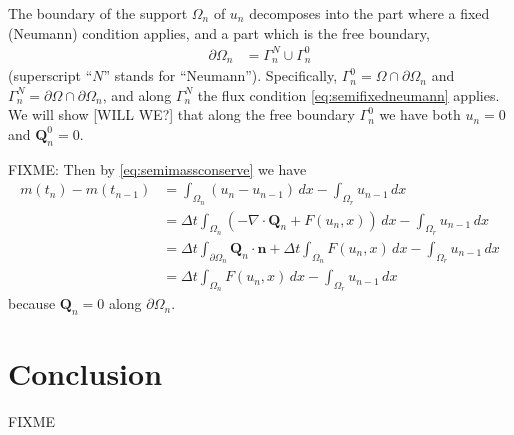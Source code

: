 \documentclass[final,leqno,onefignum,onetabnum]{siamltex1213bueler}
\newcommand\bn{\mathbf{n}}
\newcommand\bQ{\mathbf{Q}}
\newcommand{\Div}{\nabla\cdot}
\begin{document}
The boundary of the support $\Omega_n$ of $u_n$ decomposes into the part where a fixed (Neumann) condition applies, and a part which is the free boundary,
\begin{align*}
\partial\Omega_n &= \Gamma_n^N \cup \Gamma_n^0
\end{align*}
(superscript ``$N$'' stands for ``Neumann'').  Specifically, $\Gamma_n^0 = \Omega \cap \partial \Omega_n$ and $\Gamma_n^N = \partial \Omega \cap \partial \Omega_n$, and along $\Gamma_n^N$ the flux condition \eqref{eq:semifixedneumann} applies.  We will show [WILL WE?] that along the free boundary $\Gamma_n^0$ we have both $u_n=0$ and $\bQ_n^0 = 0$.

FIXME: Then by \eqref{eq:semimassconserve} we have
\begin{align*}
m(t_{n}) - m(t_{n-1}) &= \int_{\Omega_n} (u_n - u_{n-1})\,dx - \int_{\Omega_r} u_{n-1}\,dx \\
   &= \Delta t \int_{\Omega_n} (- \Div \bQ_n + F(u_n,x)) \,dx - \int_{\Omega_r} u_{n-1}\,dx \\
   &= \Delta t \int_{\partial\Omega_n} \bQ_n \cdot \bn + \Delta t \int_{\Omega_n} F(u_n,x)\,dx - \int_{\Omega_r} u_{n-1}\,dx \\
   &= \Delta t \int_{\Omega_n} F(u_n,x)\,dx - \int_{\Omega_r} u_{n-1}\,dx
\end{align*}
because $\bQ_n=0$ along $\partial\Omega_n$.



\section{Conclusion}  FIXME





\end{document}

